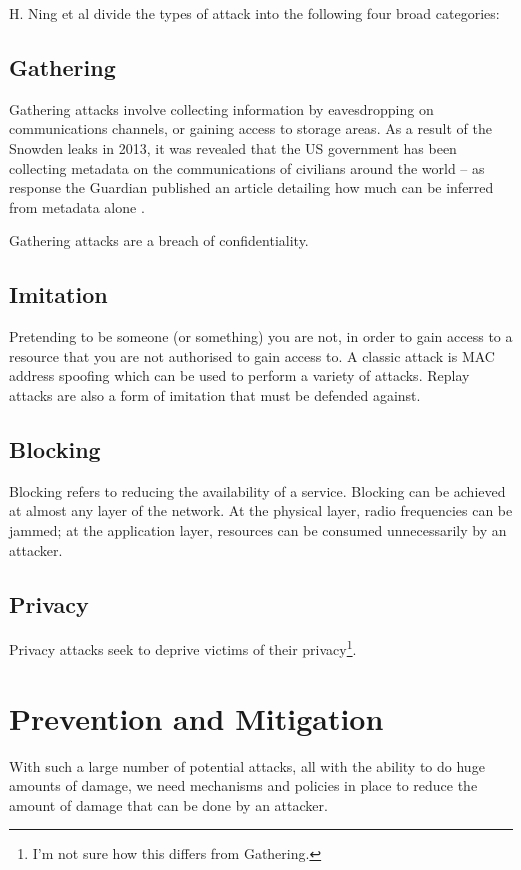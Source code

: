 \documentclass[10pt,journal,compsoc]{IEEEtran}
\begin{document}
H. Ning et al \cite{Ning2013} divide the types of attack into the following
four broad categories:

\subsection{Gathering}
Gathering attacks involve collecting information by eavesdropping on
communications channels, or gaining access to storage areas. As a result of the
Snowden leaks in 2013, it was revealed that the US government has been
collecting metadata on the communications of civilians around the world -- as
response the Guardian published an article detailing how much can be inferred
from metadata alone \cite{Guardian2013}. 

Gathering attacks are a breach of confidentiality. 

\subsection{Imitation}
Pretending to be someone (or something) you are not, in order to gain access to
a resource that you are not authorised to gain access to. A classic attack is
MAC address spoofing which can be used to perform a variety of attacks. Replay
attacks are also a form of imitation that must be defended against. 

\subsection{Blocking}
Blocking refers to reducing the availability of a service. Blocking can be
achieved at almost any layer of the network. At the physical layer, radio
frequencies can be jammed; at the application layer, resources can be consumed
unnecessarily by an attacker.  

\subsection{Privacy}
Privacy attacks seek to deprive victims of their privacy\footnote{I'm not sure
how this differs from Gathering.}.


\section{Prevention and Mitigation}
With such a large number of potential attacks, all with the ability to do huge
amounts of damage, we need mechanisms and policies in place to reduce the
amount of damage that can be done by an attacker. 
\end{document}
